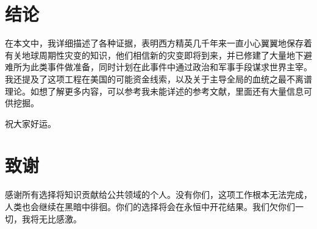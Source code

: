 \documentclass[10pt,twocolumn,letterpaper]{article}
\begin{document}
\section{结论}

在本文中，我详细描述了各种证据，表明西方精英几千年来一直小心翼翼地保存着有关地球周期性灾变的知识，他们相信新的灾变即将到来，并已修建了大量地下避难所为此类事件做准备，同时计划在此事件中通过政治和军事手段谋求世界主宰。我还提及了这项工程在美国的可能资金线索，以及关于主导全局的血统之最不离谱理论。如想了解更多内容，可以参考我未能详述的参考文献，里面还有大量信息可供挖掘。

祝大家好运。

\section{致谢}

感谢所有选择将知识贡献给公共领域的个人。没有你们，这项工作根本无法完成，人类也会继续在黑暗中徘徊。你们的选择将会在永恒中开花结果。我们欠你们一切，我将无比感激。

\clearpage
\twocolumn

{\small


}
\end{document}
